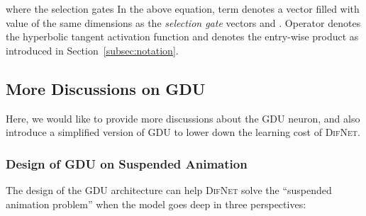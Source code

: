 \documentclass{article}
\newcommand{\our}{\textsc{DifNet}}
\newcommand{\gdu}{\textsc{GDU}}
\begin{document}
where the selection gates
\endgroup
In the above equation, term  denotes a vector filled with value  of the same dimensions as the \textit{selection gate} vectors  and . Operator  denotes the hyperbolic tangent activation function and  denotes the entry-wise product as introduced in Section~\ref{subsec:notation}.




\subsection{More Discussions on {\gdu}}

Here, we would like to provide more discussions about the {\gdu} neuron, and also introduce a simplified version of {\gdu} to lower down the learning cost of {\our}.

\subsubsection{Design of {\gdu} on Suspended Animation}

The design of the {\gdu} architecture can help {\our} solve the ``suspended animation problem'' when the model goes deep in three perspectives:
\end{document}
